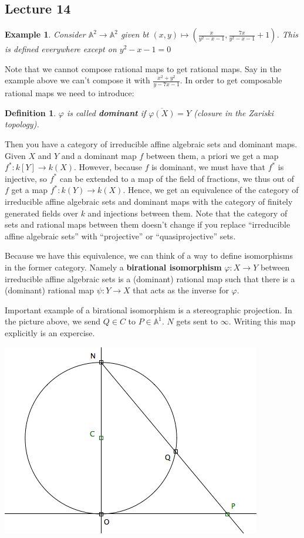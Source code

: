 \documentclass[12pt]{article}
\newcommand{\A}{\mathbb{A}}
\renewcommand{\phi}{\varphi}
\newtheorem{definition}{Definition}[section]
\newtheorem*{example}{Example}
\begin{document}
    \subsection{Lecture 14}
    \begin{example}
        Consider $\A^2 \to \A^2$ given bt $(x, y) \mapsto \left( \frac{x}{y^2-x-1}, \frac{7x}{y^2 - x- 1} + 1\right)$. This is defined everywhere except on $y^2 - x -1 = 0$
    \end{example}
    Note that we cannot compose rational maps to get rational maps. Say in the example above we can't compose it with $\frac{x^2 + y^2}{y-7x-1}$.  In order to get composable rational maps we need to introduce:
    \begin{definition}
        $\phi$ is called \textbf{dominant} if $\overline{\phi(X)} = Y$ (closure in the Zariski topology).
    \end{definition}
    Then you have a category of irreducible affine algebraic sets and dominant maps. Given $X$ and $Y$ and a dominant map $f$ between them, a priori we get a map $f^*: k[Y] \to k(X)$. However, because $f$ is dominant, we must have that $f^*$ is injective, so $f^*$ can be extended to a map of the field of fractions, we thus out of $f$ get a map $f^*: k(Y) \to k(X)$. Hence, we get an equivalence of the category of irreducible affine algebraic sets and dominant maps with the category of finitely generated fields over $k$ and injections between them. Note that the category of sets and rational maps between them doesn't change if you replace ``irreducible affine algebraic sets'' with ``projective'' or ``quasiprojective'' sets. \par
    Because we have this equivalence, we can think of a way to define isomorphisms in the former category. Namely a \textbf{birational isomorphism} $\phi: X \to Y$ between irreducible affine algebraic sets is a (dominant) rational map such that there is a (dominant) rational map $\psi: Y \to X$ that acts as the inverse for $\phi$. \par
    Important example of a birational isomorphism is a stereographic projection. In the picture above, we send $Q \in C$ to $P \in \A^1$. $N$ gets sent to $\infty$. Writing this map explicitly is an expercise.
    \begin{center}
        \includegraphics[width = 0.5\linewidth]{stereo.png}
    \end{center}
\end{document}
